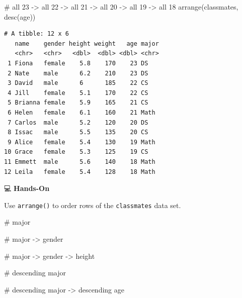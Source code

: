 \documentclass[
  letterpaper,
  DIV=11,
  numbers=noendperiod]{scrreprt}
\newenvironment{Shaded}{\begin{snugshade}}{\end{snugshade}}
\newcommand{\CommentTok}[1]{\textcolor[rgb]{0.37,0.37,0.37}{#1}}
\newcommand{\FunctionTok}[1]{\textcolor[rgb]{0.28,0.35,0.67}{#1}}
\newcommand{\NormalTok}[1]{\textcolor[rgb]{0.00,0.23,0.31}{#1}}
\begin{document}
\begin{Shaded}
\begin{Highlighting}[]
\CommentTok{\# all 23 {-}\textgreater{} all 22 {-}\textgreater{} all 21 {-}\textgreater{} all 20 {-}\textgreater{} all 19 {-}\textgreater{} all 18 }
\FunctionTok{arrange}\NormalTok{(classmates, }\FunctionTok{desc}\NormalTok{(age))}
\end{Highlighting}
\end{Shaded}

\begin{verbatim}
# A tibble: 12 x 6
   name    gender height weight   age major
   <chr>   <chr>   <dbl>  <dbl> <dbl> <chr>
 1 Fiona   female    5.8    170    23 DS   
 2 Nate    male      6.2    210    23 DS   
 3 David   male      6      185    22 CS   
 4 Jill    female    5.1    170    22 CS   
 5 Brianna female    5.9    165    21 CS   
 6 Helen   female    6.1    160    21 Math 
 7 Carlos  male      5.2    120    20 DS   
 8 Issac   male      5.5    135    20 CS   
 9 Alice   female    5.4    130    19 Math 
10 Grace   female    5.3    125    19 CS   
11 Emmett  male      5.6    140    18 Math 
12 Leila   female    5.4    128    18 Math 
\end{verbatim}

💻 \textbf{Hands-On}

Use \texttt{arrange()} to order rows of the \texttt{classmates} data
set.

\begin{Shaded}
\begin{Highlighting}[]
\CommentTok{\# major}

\CommentTok{\# major {-}\textgreater{} gender}

\CommentTok{\# major {-}\textgreater{} gender {-}\textgreater{} height}

\CommentTok{\# descending major}

\CommentTok{\# descending major {-}\textgreater{} descending age}
\end{Highlighting}
\end{Shaded}
\end{document}
